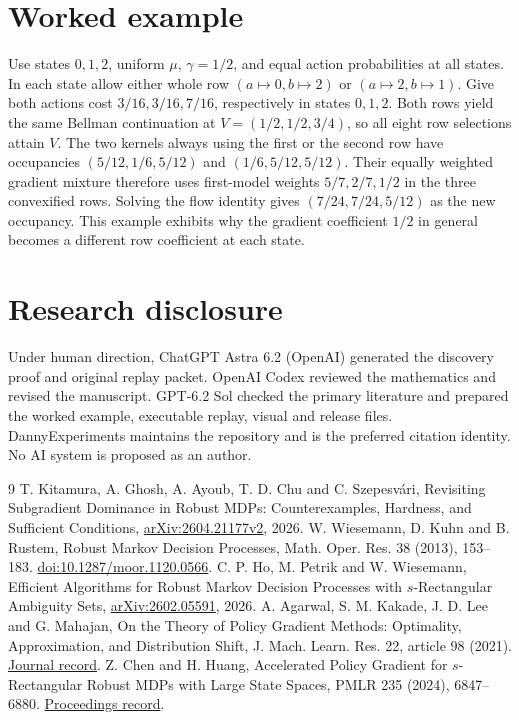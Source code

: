 \documentclass[11pt]{amsart}
\begin{document}
\section{Worked example}
Use states \(0,1,2\), uniform \(\mu\), \(\gamma=1/2\), and equal action probabilities at all states. In each state allow either whole row
\((a\mapsto 0,b\mapsto 2)\) or \((a\mapsto 2,b\mapsto 1)\).
Give both actions cost \(3/16,3/16,7/16\), respectively in states \(0,1,2\). Both rows yield the same Bellman continuation at \(V=(1/2,1/2,3/4)\), so all eight row selections attain \(V\). The two kernels always using the first or the second row have occupancies \((5/12,1/6,5/12)\) and \((1/6,5/12,5/12)\). Their equally weighted gradient mixture therefore uses first-model weights \(5/7,2/7,1/2\) in the three convexified rows. Solving the flow identity gives \((7/24,7/24,5/12)\) as the new occupancy. This example exhibits why the gradient coefficient \(1/2\) in general becomes a different row coefficient at each state.

\section*{Research disclosure}
Under human direction, ChatGPT Astra 6.2 (OpenAI) generated the discovery proof and original replay packet. OpenAI Codex reviewed the mathematics and revised the manuscript. GPT-6.2 Sol checked the primary literature and prepared the worked example, executable replay, visual and release files. DannyExperiments maintains the repository and is the preferred citation identity. No AI system is proposed as an author.

\begin{thebibliography}{9}
 T. Kitamura, A. Ghosh, A. Ayoub, T. D. Chu and C. Szepesv\'ari, Revisiting Subgradient Dominance in Robust MDPs: Counterexamples, Hardness, and Sufficient Conditions, \href{https://arxiv.org/abs/2604.21177v2}{arXiv:2604.21177v2}, 2026.
 W. Wiesemann, D. Kuhn and B. Rustem, Robust Markov Decision Processes, Math. Oper. Res. 38 (2013), 153--183. \href{https://doi.org/10.1287/moor.1120.0566}{doi:10.1287/moor.1120.0566}.
 C. P. Ho, M. Petrik and W. Wiesemann, Efficient Algorithms for Robust Markov Decision Processes with \(s\)-Rectangular Ambiguity Sets, \href{https://arxiv.org/abs/2602.05591}{arXiv:2602.05591}, 2026.
 A. Agarwal, S. M. Kakade, J. D. Lee and G. Mahajan, On the Theory of Policy Gradient Methods: Optimality, Approximation, and Distribution Shift, J. Mach. Learn. Res. 22, article 98 (2021). \href{https://www.jmlr.org/papers/v22/19-736.html}{Journal record}.
 Z. Chen and H. Huang, Accelerated Policy Gradient for \(s\)-Rectangular Robust MDPs with Large State Spaces, PMLR 235 (2024), 6847--6880. \href{https://proceedings.mlr.press/v235/chen24s.html}{Proceedings record}.
\end{thebibliography}
\end{document}
